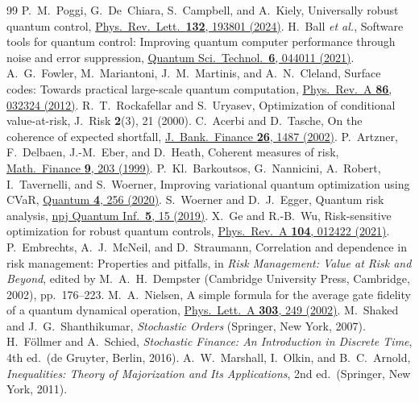 \documentclass[aps,pra,twocolumn,superscriptaddress,reprint,nofootinbib,floatfix]{revtex4-2}
\theoremstyle{definition}
\begin{document}
\begin{thebibliography}{99}
 P.~M.~Poggi, G.~De~Chiara, S.~Campbell, and A.~Kiely, Universally robust quantum control, \href{https://doi.org/10.1103/PhysRevLett.132.193801}{Phys.\ Rev.\ Lett.\ \textbf{132}, 193801 (2024)}.
 H.~Ball \emph{et al.}, Software tools for quantum control: Improving quantum computer performance through noise and error suppression, \href{https://doi.org/10.1088/2058-9565/abdca6}{Quantum Sci.\ Technol.\ \textbf{6}, 044011 (2021)}.
 A.~G.~Fowler, M.~Mariantoni, J.~M.~Martinis, and A.~N.~Cleland, Surface codes: Towards practical large-scale quantum computation, \href{https://doi.org/10.1103/PhysRevA.86.032324}{Phys.\ Rev.\ A \textbf{86}, 032324 (2012)}.
 R.~T.~Rockafellar and S.~Uryasev, Optimization of conditional value-at-risk, J.\ Risk \textbf{2}(3), 21 (2000).
 C.~Acerbi and D.~Tasche, On the coherence of expected shortfall, \href{https://doi.org/10.1016/S0378-4266(02)00283-2}{J.\ Bank.\ Finance \textbf{26}, 1487 (2002)}.
 P.~Artzner, F.~Delbaen, J.-M.~Eber, and D.~Heath, Coherent measures of risk, \href{https://doi.org/10.1111/1467-9965.00068}{Math.\ Finance \textbf{9}, 203 (1999)}.
 P.~Kl.~Barkoutsos, G.~Nannicini, A.~Robert, I.~Tavernelli, and S.~Woerner, Improving variational quantum optimization using CVaR, \href{https://doi.org/10.22331/q-2020-04-20-256}{Quantum \textbf{4}, 256 (2020)}.
 S.~Woerner and D.~J.~Egger, Quantum risk analysis, \href{https://doi.org/10.1038/s41534-019-0130-6}{npj Quantum Inf.\ \textbf{5}, 15 (2019)}.
 X.~Ge and R.-B.~Wu, Risk-sensitive optimization for robust quantum controls, \href{https://doi.org/10.1103/PhysRevA.104.012422}{Phys.\ Rev.\ A \textbf{104}, 012422 (2021)}.
 P.~Embrechts, A.~J.~McNeil, and D.~Straumann, Correlation and dependence in risk management: Properties and pitfalls, in \emph{Risk Management: Value at Risk and Beyond}, edited by M.~A.~H.~Dempster (Cambridge University Press, Cambridge, 2002), pp.~176--223.
 M.~A.~Nielsen, A simple formula for the average gate fidelity of a quantum dynamical operation, \href{https://doi.org/10.1016/S0375-9601(02)01272-0}{Phys.\ Lett.\ A \textbf{303}, 249 (2002)}.
 M.~Shaked and J.~G.~Shanthikumar, \emph{Stochastic Orders} (Springer, New York, 2007).
 H.~F\"ollmer and A.~Schied, \emph{Stochastic Finance: An Introduction in Discrete Time}, 4th ed.\ (de Gruyter, Berlin, 2016).
 A.~W.~Marshall, I.~Olkin, and B.~C.~Arnold, \emph{Inequalities: Theory of Majorization and Its Applications}, 2nd ed.\ (Springer, New York, 2011).

\end{thebibliography}
\end{document}
